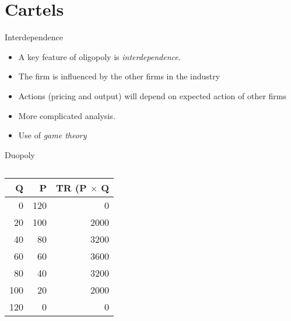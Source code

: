 \documentclass[14pt,xcolor=pdftex,dvipsnames,table]{beamer}\usepackage[]{graphicx}\usepackage[]{color}
\begin{document}
\section{Cartels}
\begin{frame}{Interdependence}
\begin{itemize}[<+-| alert@+>]
\item A key feature of oligopoly is \emph{interdependence}.  
\item The firm is influenced by the other firms in the industry
\item Actions (pricing and output) will depend on expected action of other firms
\item More complicated analysis.
\item Use of \emph{game theory}
\end{itemize}
\end{frame}

\begin{frame}{Duopoly}
\begin{columns}[T]
\begin{column}{.48\textwidth}
\begin{center}
\begin{tabular}{r r r}
Q & P & TR (P $\times$ Q\\
\hline
0 & 120 & 0\\
20 & 100 & 2000\\
40 & 80 & 3200\\
60 & 60 & 3600\\
80 & 40 & 3200\\
100 & 20 & 2000\\
120 & 0 & 0\\
\end{tabular}
\end{center} 
\end{column}
\begin{column}{.48\textwidth}
\end{column}
\end{columns}
\end{frame}
\end{document}
